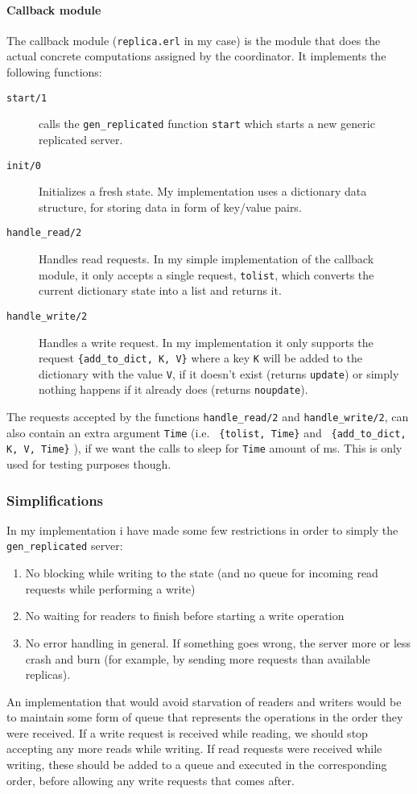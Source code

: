 \documentclass[a4paper]{article}
\begin{document}
\paragraph{Callback module}
\label{par:Callback module}
The callback module (\texttt{replica.erl} in my case) is the module that does the actual concrete computations assigned by the coordinator. It implements the following functions:
\begin{description}
  \item[\texttt{start/1}] calls the \texttt{gen\_replicated} function \texttt{start} which starts a new generic replicated server.
  \item[\texttt{init/0}] Initializes a fresh state. My implementation uses a dictionary data structure, for storing data in form of key/value pairs.
  \item[\texttt{handle\_read/2}] Handles read requests. In my simple implementation of the callback module, it only accepts a single request, \texttt{tolist}, which converts the current dictionary state into a list and returns it.
  \item[\texttt{handle\_write/2}] Handles a write request. In my implementation it only supports the request \texttt{\{add\_to\_dict, K, V\}} where a key \texttt{K} will be added to the dictionary with the value \texttt{V}, if it doesn't exist (returns \texttt{update}) or simply nothing happens if it already does (returns \texttt{noupdate}).
\end{description}
The requests accepted by the functions \texttt{handle\_read/2} and \texttt{handle\_write/2}, can also contain an extra argument \texttt{Time} (i.e. \texttt{ \{tolist, Time\}} and \texttt{ \{add\_to\_dict, K, V, Time\}} ), if we want the calls to sleep for \texttt{Time} amount of ms. This is only used for testing purposes though.
\subsubsection{Simplifications}
\label{ssub:simplifications_gen}
In my implementation i have made some few restrictions in order to simply the \texttt{gen\_replicated} server:
\begin{enumerate}
  \item No blocking while writing to the state (and no queue for incoming read requests while performing a write)
  \item No waiting for readers to finish before starting a write operation
  \item No error handling in general. If something goes wrong, the server more or less crash and burn (for example, by sending more requests than available replicas).
\end{enumerate}
An implementation that would avoid starvation of readers and writers would be to maintain some form of queue that represents the operations in the order they were received. If a write request is received while reading, we should stop accepting any more reads while writing. If read requests were received while writing, these should be added to a queue and executed in the corresponding order, before allowing any write requests that comes after.
\end{document}
